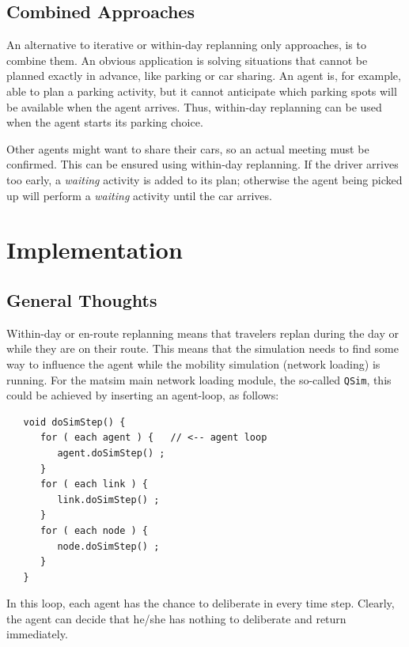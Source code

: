\subsection{Combined Approaches} \label{sec:CombinedApproaches}
An alternative to iterative or within-day replanning only approaches, is to combine them. An obvious application is solving situations that cannot be planned exactly in advance, like parking or car sharing. An agent is, for example, able to plan a parking activity, but it cannot anticipate which parking spots will be available when the agent arrives. Thus, within-day replanning can be used when the agent starts its parking choice.

Other agents might want to share their cars, so an actual meeting must be confirmed. This can be ensured using within-day replanning. If the driver arrives too early, a \emph{waiting} activity is added to its plan; otherwise the agent being picked up will perform a \emph{waiting} activity until the car arrives.


\section{Implementation}
\subsection{General Thoughts}

Within-day or en-route replanning means that travelers replan during the day or while they are on their route.  This means that the simulation needs to find some way to influence the agent while the mobility simulation (network loading) is running.  For the \acrshort{matsim} main network loading module, the so-called \lstinline$QSim$, this could be achieved by inserting an agent-loop, as follows:
\begin{lstlisting}
   void doSimStep() {
      for ( each agent ) {   // <-- agent loop
         agent.doSimStep() ;
      }
      for ( each link ) {
         link.doSimStep() ;
      }
      for ( each node ) {
         node.doSimStep() ;
      }
   }  
\end{lstlisting}
In this loop, each agent has the chance to deliberate in every time step.  Clearly, the agent can decide that he/she has nothing to deliberate and return immediately.

